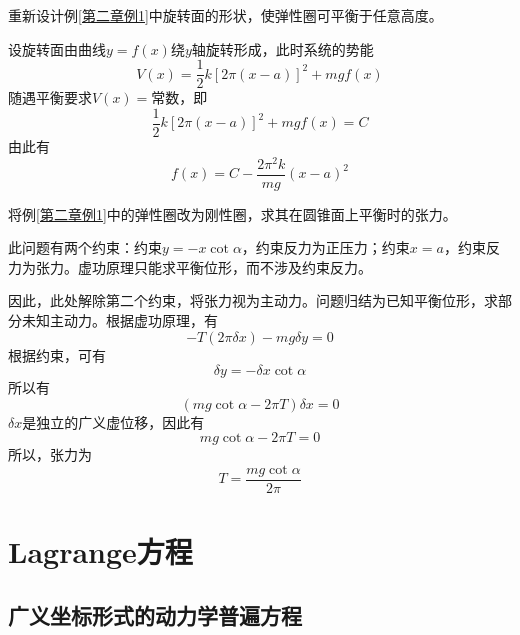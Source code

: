 \begin{example}
重新设计例\ref{第二章例1}中旋转面的形状，使弹性圈可平衡于任意高度。
\end{example}
\begin{solution}
设旋转面由曲线$y=f(x)$绕$y$轴旋转形成，此时系统的势能
\begin{equation*}
	V(x) = \frac12 k\left[2\pi(x-a)\right]^2 + mgf(x)
\end{equation*}
随遇平衡要求$V(x) = \text{常数}$，即
\begin{equation*}
	\frac12 k\left[2\pi(x-a)\right]^2 + mgf(x) = C
\end{equation*}
由此有
\begin{equation*}
	f(x) = C-\frac{2\pi^2 k}{mg}(x-a)^2
\end{equation*}
\end{solution}

\begin{example}
将例\ref{第二章例1}中的弹性圈改为刚性圈，求其在圆锥面上平衡时的张力。
\end{example}
\begin{solution}
此问题有两个约束：约束$y=-x\cot\alpha$，约束反力为正压力；约束$x=a$，约束反力为张力。虚功原理只能求平衡位形，而不涉及约束反力。

因此，此处解除第二个约束，将张力视为主动力。问题归结为已知平衡位形，求部分未知主动力。根据虚功原理，有
\begin{equation*}
	-T(2\pi \delta x) - mg\delta y = 0
\end{equation*}
根据约束，可有
\begin{equation*}
	\delta y = -\delta x \cot \alpha
\end{equation*}
所以有
\begin{equation*}
	(mg\cot \alpha - 2\pi T) \delta x = 0
\end{equation*}
$\delta x$是独立的广义虚位移，因此有
\begin{equation*}
	mg\cot \alpha - 2\pi T = 0
\end{equation*}
所以，张力为
\begin{equation*}
	T = \frac{mg\cot \alpha}{2\pi}
\end{equation*}
\end{solution}

\section{Lagrange方程}

\subsection{广义坐标形式的动力学普遍方程}

